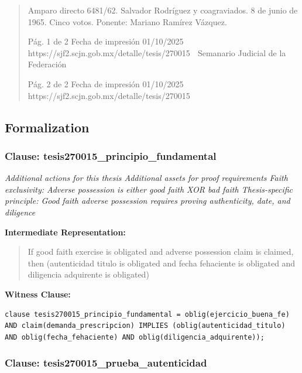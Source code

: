 \documentclass[11pt,a4paper]{article}
\begin{document}
\begin{quote}
Amparo directo 6481/62. Salvador Rodríguez y coagraviados. 8 de junio de 1965. Cinco votos.
Ponente: Mariano Ramírez Vázquez.




                                             Pág. 1 de 2             Fecha de impresión 01/10/2025
  https://sjf2.scjn.gob.mx/detalle/tesis/270015
                                                Semanario Judicial de la Federación




                                           Pág. 2 de 2       Fecha de impresión 01/10/2025
https://sjf2.scjn.gob.mx/detalle/tesis/270015

\end{quote}

\subsection{Formalization}

\subsubsection{Clause: tesis270015\_principio\_fundamental}

\textit{Additional actions for this thesis Additional assets for proof requirements Faith exclusivity: Adverse possession is either good faith XOR bad faith Thesis-specific principle: Good faith adverse possession requires proving authenticity, date, and diligence}

\textbf{Intermediate Representation:}

\begin{quote}
If good faith exercise is obligated and adverse possession claim is claimed, then (autenticidad titulo is obligated and fecha fehaciente is obligated and diligencia adquirente is obligated)
\end{quote}

\textbf{Witness Clause:}

\begin{lstlisting}[style=witnessstyle, language=Witness]
clause tesis270015_principio_fundamental = oblig(ejercicio_buena_fe) AND claim(demanda_prescripcion) IMPLIES (oblig(autenticidad_titulo) AND oblig(fecha_fehaciente) AND oblig(diligencia_adquirente));
\end{lstlisting}

\subsubsection{Clause: tesis270015\_prueba\_autenticidad}
\end{document}
